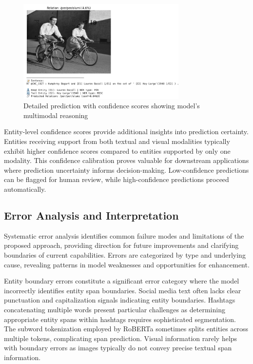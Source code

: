 \documentclass[12pt,a4paper]{report}
\begin{document}
\begin{figure}[H]
\centering
\includegraphics[width=0.75\textwidth]{pred3.png}
\caption{Detailed prediction with confidence scores showing model's multimodal reasoning}
\label{fig:prediction3}
\end{figure}

Entity-level confidence scores provide additional insights into prediction certainty. Entities receiving support from both textual and visual modalities typically exhibit higher confidence scores compared to entities supported by only one modality. This confidence calibration proves valuable for downstream applications where prediction uncertainty informs decision-making. Low-confidence predictions can be flagged for human review, while high-confidence predictions proceed automatically.

\subsection{Error Analysis and Interpretation}

Systematic error analysis identifies common failure modes and limitations of the proposed approach, providing direction for future improvements and clarifying boundaries of current capabilities. Errors are categorized by type and underlying cause, revealing patterns in model weaknesses and opportunities for enhancement.

Entity boundary errors constitute a significant error category where the model incorrectly identifies entity span boundaries. Social media text often lacks clear punctuation and capitalization signals indicating entity boundaries. Hashtags concatenating multiple words present particular challenges as determining appropriate entity spans within hashtags requires sophisticated segmentation. The subword tokenization employed by RoBERTa sometimes splits entities across multiple tokens, complicating span prediction. Visual information rarely helps with boundary errors as images typically do not convey precise textual span information.
\end{document}
